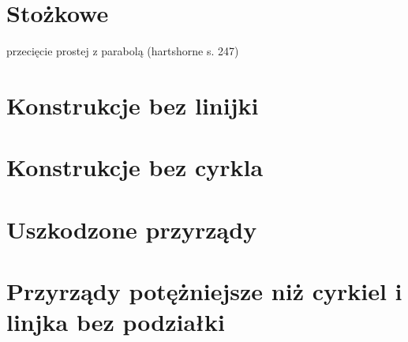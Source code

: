 \section{Stożkowe}
przecięcie prostej z parabolą (hartshorne s. 247)


\section{Konstrukcje bez linijki}



\section{Konstrukcje bez cyrkla}


\section{Uszkodzone przyrządy}


\section{Przyrządy potężniejsze niż cyrkiel i linjka bez podziałki}


